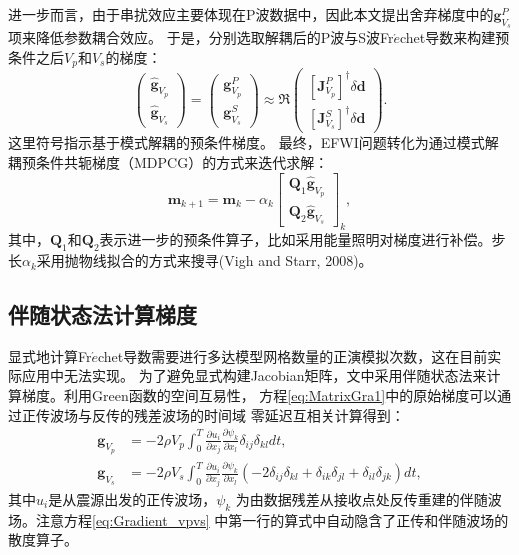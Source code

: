 进一步而言，由于串扰效应主要体现在P波数据中，因此本文提出舍弃梯度中的$\mathbf{g}_{V_s}^P$项来降低参数耦合效应。
于是，分别选取解耦后的P波与S波Fr{$\acute{e}$}chet导数来构建预条件之后$V_p$和$V_s$的梯度：
\begin{equation}
        \begin{pmatrix}
                \hat{\mathbf{g}}_{V_p}\\
                \hat{\mathbf{g}}_{V_s}
        \end{pmatrix}=
        \begin{pmatrix}
                \mathbf{g}_{V_p}^P\\
                \mathbf{g}_{V_s}^S
        \end{pmatrix}
        \approx 
        \mathfrak{R}\begin{pmatrix}
                [\mathbf{J}^P_{V_p}]^{\dagger} \delta \mathbf{d}\\
                [\mathbf{J}^S_{V_s}]^{\dagger} \delta \mathbf{d}
        \end{pmatrix}.
        \label{eq:MatrixGraMode}
\end{equation}
这里符号$\hat{}$指示基于模式解耦的预条件梯度。
最终，EFWI问题转化为通过模式解耦预条件共轭梯度（MDPCG）的方式来迭代求解：
\begin{equation}
        \mathbf{m}_{k+1}=\mathbf{m}_{k}-\alpha_k
        \begin{bmatrix}\mathbf{Q}_1\hat{\mathbf{g}}_{V_p}\\\mathbf{Q}_2\hat{\mathbf{g}}_{V_s}\end{bmatrix}_{k},
        \label{eq:Gradientmethod}
\end{equation}
其中，$\mathbf{Q}_1$和$\mathbf{Q}_2$表示进一步的预条件算子，比如采用能量照明对梯度进行补偿。步长$\alpha_k$采用抛物线拟合的方式来搜寻(Vigh
and Starr, 2008\cite[]{vigh20083d})。

\subsection{伴随状态法计算梯度}
显式地计算Fr{$\acute{e}$}chet导数需要进行多达模型网格数量的正演模拟次数，这在目前实际应用中无法实现\cite[]{virieux2009overview}。
为了避免显式构建Jacobian矩阵，文中采用伴随状态法来计算梯度\cite[]{tromp2005seismic,plessix2006}。利用Green函数的空间互易性，
方程\eqref{eq:MatrixGra1}中的原始梯度可以通过正传波场与反传的残差波场的时间域
零延迟互相关计算得到：
\begin{equation} 
        \begin{split}
        \mathbf{g}_{V_p}&=-2\rho V_p\int_{0}^{T}\frac{\partial u_i}{\partial
        x_j}\frac{\partial \psi_k}{\partial x_l}
        \delta_{ij}\delta_{kl}dt,\\
        \mathbf{g}_{V_s}&=-2\rho V_s\int_{0}^{T}\frac{\partial u_i}{\partial
        x_j}\frac{\partial \psi_k}{\partial x_l}
        (-2\delta_{ij}\delta_{kl}+\delta_{ik}\delta_{jl}+\delta_{il}\delta_{jk})dt,
        \end{split}
        \label{eq:Gradient_vpvs}
\end{equation}
其中$u_i$是从震源出发的正传波场，$\psi_k$ 为由数据残差从接收点处反传重建的伴随波场。注意方程\eqref{eq:Gradient_vpvs}
中第一行的算式中自动隐含了正传和伴随波场的散度算子。

